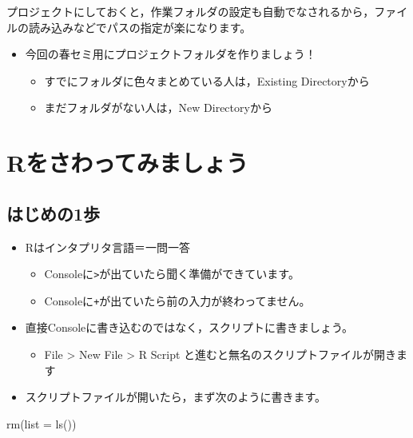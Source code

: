 \documentclass[
  a4paper,
]{ltjsbook}
\newenvironment{Shaded}{\begin{snugshade}}{\end{snugshade}}
\newcommand{\AttributeTok}[1]{\textcolor[rgb]{0.40,0.45,0.13}{#1}}
\newcommand{\FunctionTok}[1]{\textcolor[rgb]{0.28,0.35,0.67}{#1}}
\newcommand{\NormalTok}[1]{\textcolor[rgb]{0.00,0.23,0.31}{#1}}
\providecommand{\tightlist}{%
  \setlength{\itemsep}{0pt}\setlength{\parskip}{0pt}}\usepackage{longtable,booktabs,array}
\begin{document}
プロジェクトにしておくと，作業フォルダの設定も自動でなされるから，ファイルの読み込みなどでパスの指定が楽になります。

\begin{itemize}
\tightlist
\item
  今回の春セミ用にプロジェクトフォルダを作りましょう！

  \begin{itemize}
  \tightlist
  \item
    すでにフォルダに色々まとめている人は，Existing Directoryから
  \item
    まだフォルダがない人は，New Directoryから
  \end{itemize}
\end{itemize}

\section{Rをさわってみましょう}\label{rux3092ux3055ux308fux3063ux3066ux307fux307eux3057ux3087ux3046}

\subsection{はじめの1歩}\label{ux306fux3058ux3081ux306e1ux6b69}

\begin{itemize}
\tightlist
\item
  Rはインタプリタ言語＝一問一答

  \begin{itemize}
  \tightlist
  \item
    Consoleに\texttt{\textgreater{}}が出ていたら聞く準備ができています。
  \item
    Consoleに\texttt{+}が出ていたら前の入力が終わってません。
  \end{itemize}
\item
  直接Consoleに書き込むのではなく，スクリプトに書きましょう。

  \begin{itemize}
  \tightlist
  \item
    File \textgreater{} New File \textgreater{} R Script
    と進むと無名のスクリプトファイルが開きます
  \end{itemize}
\item
  スクリプトファイルが開いたら，まず次のように書きます。
\end{itemize}

\begin{Shaded}
\begin{Highlighting}[]
\FunctionTok{rm}\NormalTok{(}\AttributeTok{list =} \FunctionTok{ls}\NormalTok{())}
\end{Highlighting}
\end{Shaded}
\end{document}

